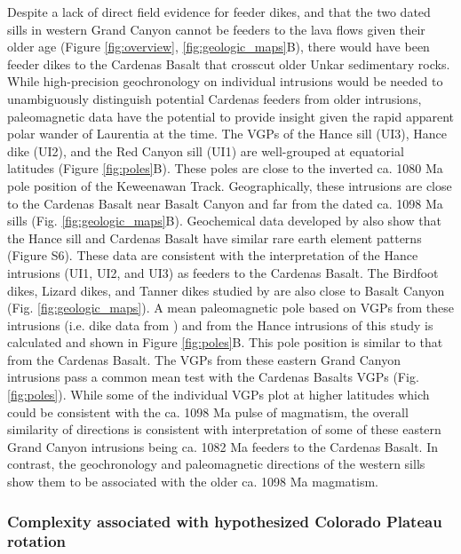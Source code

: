 Despite a lack of direct field evidence for feeder dikes, and that the two dated sills in western Grand Canyon cannot be feeders to the lava flows given their older age (Figure \ref{fig:overview}, \ref{fig:geologic_maps}B), there would have been feeder dikes to the Cardenas Basalt that crosscut older Unkar sedimentary rocks. While high-precision geochronology on individual intrusions would be needed to unambiguously distinguish potential Cardenas feeders from older intrusions, paleomagnetic data have the potential to provide insight given the rapid apparent polar wander of Laurentia at the time. The VGPs of the Hance sill (UI3), Hance dike (UI2), and the Red Canyon sill (UI1) are well-grouped at equatorial latitudes (Figure \ref{fig:poles}B). These poles are close to the inverted ca. 1080 Ma pole position of the Keweenawan Track. Geographically, these intrusions are close to the Cardenas Basalt near Basalt Canyon and far from the dated ca. 1098 Ma sills (Fig. \ref{fig:geologic_maps}B). Geochemical data developed by \cite{Larson1994a} also show that the Hance sill and Cardenas Basalt have similar rare earth element patterns (Figure S6). These data are consistent with the interpretation of the Hance intrusions (UI1, UI2, and UI3) as feeders to the Cardenas Basalt. The Birdfoot dikes, Lizard dikes, and Tanner dikes studied by \cite{Weil2003a} are also close to Basalt Canyon (Fig. \ref{fig:geologic_maps}). A mean paleomagnetic pole based on VGPs from these intrusions (i.e. dike data from \cite{Weil2003a}) and from the Hance intrusions of this study is calculated and shown in Figure \ref{fig:poles}B. This pole position is similar to that from the Cardenas Basalt. The VGPs from these eastern Grand Canyon intrusions pass a common mean test with the Cardenas Basalts VGPs (Fig. \ref{fig:poles}). While some of the individual VGPs plot at higher latitudes which could be consistent
with the ca. 1098 Ma pulse of magmatism, the overall similarity of directions is consistent with interpretation of some of these eastern Grand Canyon intrusions being ca. 1082 Ma feeders to the Cardenas Basalt. In contrast, the geochronology and paleomagnetic directions of the western sills show them to be associated with the older ca. 1098 Ma magmatism. 

\subsubsection*{Complexity associated with hypothesized Colorado Plateau rotation}

